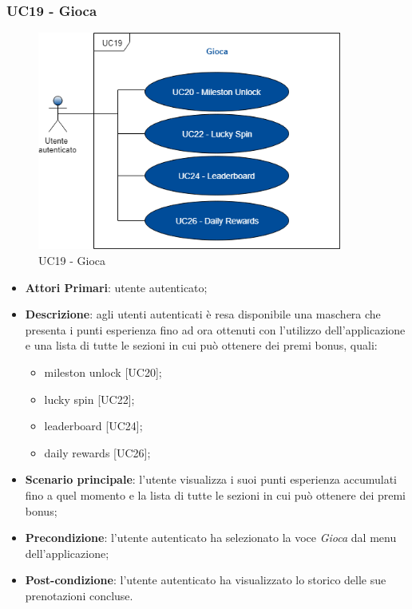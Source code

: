 \subsubsection{UC19 - Gioca}
 \begin{figure}[h]
	\includegraphics[width=10cm]{res/images/UC19Gioca.png}
	\centering
	\caption{UC19 - Gioca}
\end{figure}
\begin{itemize}
	\item \textbf{Attori Primari}: utente autenticato;
	\item \textbf{Descrizione}: agli utenti autenticati è resa disponibile una maschera che presenta i punti esperienza fino ad ora ottenuti con l'utilizzo dell'applicazione e una lista di tutte le sezioni in cui può ottenere dei premi bonus, quali:
	\begin{itemize}
		\item mileston unlock [UC20];
		\item lucky spin [UC22];
		\item leaderboard [UC24];
		\item daily rewards [UC26];
	\end{itemize} 
	\item \textbf{Scenario principale}: l'utente visualizza i suoi punti esperienza accumulati fino a quel momento e la lista di tutte le sezioni in cui può ottenere dei premi bonus;
	\item \textbf{Precondizione}: l'utente autenticato ha selezionato la voce \textit{Gioca} dal menu dell'applicazione;
	\item \textbf{Post-condizione}: l'utente autenticato ha visualizzato lo storico delle sue prenotazioni concluse. 
\end{itemize} 

